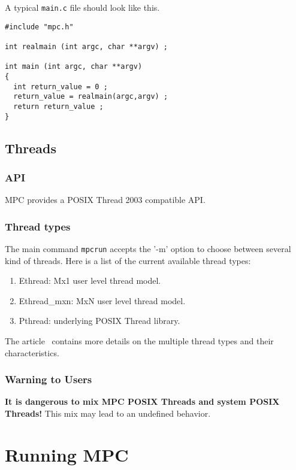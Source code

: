 \documentclass[a4paper,11pt]{article}
\begin{document}
A typical \texttt{main.c} file should look like this.
\begin{verbatim}
#include "mpc.h"

int realmain (int argc, char **argv) ;

int main (int argc, char **argv)
{
  int return_value = 0 ;
  return_value = realmain(argc,argv) ;
  return return_value ;
}
\end{verbatim}

\subsection{Threads}

\subsubsection{API}
MPC provides a POSIX Thread 2003 compatible API.

\subsubsection{Thread types}
The main command \texttt{mpcrun} accepts the '-m' option to choose between several kind of threads.
Here is a list of the current available thread types:

\begin{enumerate}
  \item  Ethread: Mx1 user level thread model.

  \item   Ethread\_mxn: MxN user level thread model.

  \item   Pthread: underlying POSIX Thread library.

\end{enumerate}
The article~\cite{Perache08} contains more details on the multiple thread types and their characteristics.


\subsubsection{Warning to Users}
\textbf{It is dangerous to mix MPC POSIX Threads and system POSIX Threads!}
This mix may lead to an undefined behavior.

\section{Running MPC}
\end{document}
